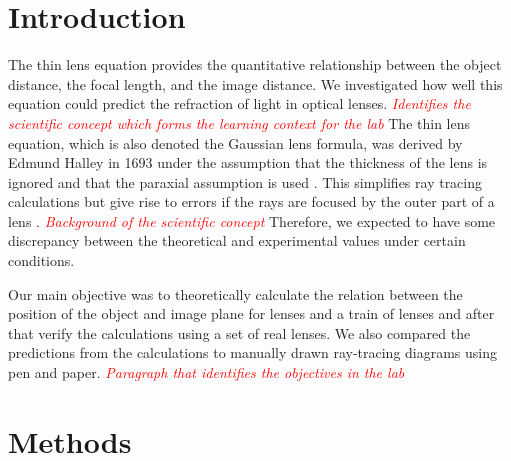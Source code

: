 \documentclass[fleqn,10pt]{SelfArx} %
\affiliation{\textsuperscript{1}\textit{Department of Physics, Umeå University, Umeå, Sweden}} %
\affiliation{*\textbf{Corresponding author}: heli0152@student.umu.se} %
\affiliation{*\textbf{Supervisor}: joe@doe.com}
\begin{document}
\flushbottom %

\maketitle %

\tableofcontents %

\thispagestyle{empty} %


\section{Introduction}
The thin lens equation provides the quantitative relationship between the object distance, the focal length, and the image distance. We investigated how well this equation could predict the refraction of light in optical lenses. \textcolor{red}{\textit{{Identifies the scientific concept which forms the learning context for the lab}}} The thin lens equation, which is also denoted the Gaussian lens formula, was derived by Edmund Halley in 1693 under the assumption that the thickness of the lens is ignored and that the paraxial assumption is used \cite{Steinhaus:Mathematical}. This simplifies ray tracing calculations but give rise to errors if the rays are focused by the outer part of a lens \cite{Greivenkamp:FieldGuide}. \textcolor{red}{\textit{Background of the scientific concept}} Therefore, we expected to have some discrepancy between the theoretical and experimental values under certain conditions.

Our main objective was to theoretically calculate the relation between the position of the object and image plane for lenses and a train of lenses and after that verify the calculations using a set of real lenses. We also compared the predictions from the calculations to manually drawn ray-tracing diagrams using pen and paper. \textcolor{red}{\textit{Paragraph that identifies the objectives in the lab}}

\section{Methods}
\end{document}
